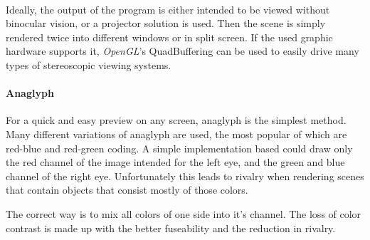 \paragraph{}
Ideally, the output of the program is either intended to be viewed without binocular vision, or a projector solution is used.
Then the scene is simply rendered twice into different windows or in split screen.
If the used graphic hardware supports it, \textit{OpenGL}'s QuadBuffering can be used to easily drive many types of stereoscopic viewing systems.

\paragraph{Anaglyph}
For a quick and easy preview on any screen, anaglyph is the simplest method.
Many different variations of anaglyph are used, the most popular of which are red-blue and red-green coding.
A simple implementation based could draw only the red channel of the image intended for the left eye, and the green and blue channel of the right eye.
Unfortunately this leads to rivalry when rendering scenes that contain objects that consist mostly of those colors.

The correct way is to mix all colors of one side into it's channel.
The loss of color contrast is made up with the better fuseability and the reduction in rivalry.


